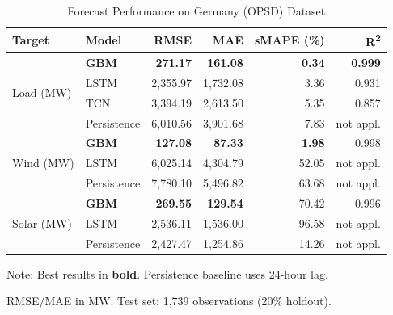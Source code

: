 
\begin{table}[htbp]
\centering
\caption{Forecast Performance on Germany (OPSD) Dataset}
\label{tab:forecast_de}
\begin{tabular}{llrrrr}
\toprule
\textbf{Target} & \textbf{Model} & \textbf{RMSE} & \textbf{MAE} & \textbf{sMAPE (\%)} & \textbf{R\textsuperscript{2}} \\
\midrule
\multirow{4}{*}{Load (MW)} 
 & \textbf{GBM} & \textbf{271.17} & \textbf{161.08} & \textbf{0.34} & \textbf{0.999} \\
 & LSTM & 2,355.97 & 1,732.08 & 3.36 & 0.931 \\
 & TCN & 3,394.19 & 2,613.50 & 5.35 & 0.857 \\
 & Persistence & 6,010.56 & 3,901.68 & 7.83 & not appl. \\
\midrule
\multirow{3}{*}{Wind (MW)}
 & \textbf{GBM} & \textbf{127.08} & \textbf{87.33} & \textbf{1.98} & 0.998 \\
 & LSTM & 6,025.14 & 4,304.79 & 52.05 & not appl. \\
 & Persistence & 7,780.10 & 5,496.82 & 63.68 & not appl. \\
\midrule
\multirow{3}{*}{Solar (MW)}
 & \textbf{GBM} & \textbf{269.55} & \textbf{129.54} & 70.42 & 0.996 \\
 & LSTM & 2,536.11 & 1,536.00 & 96.58 & not appl. \\
 & Persistence & 2,427.47 & 1,254.86 & 14.26 & not appl. \\
\bottomrule
\end{tabular}
\begin{tablenotes}
\small
\item Note: Best results in \textbf{bold}. Persistence baseline uses 24-hour lag.
\item RMSE/MAE in MW. Test set: 1,739 observations (20\% holdout).
\end{tablenotes}
\end{table}
